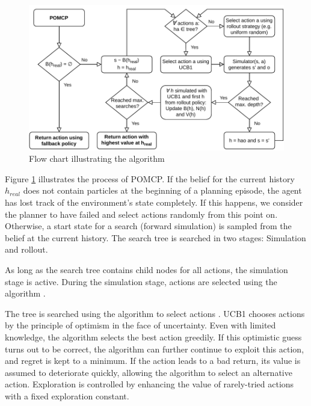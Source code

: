 \begin{figure}[htbp]
    \centerfloat
    \includegraphics[width=1.0\textwidth]{figures/POMCP.pdf}
    \caption{Flow chart illustrating the  algorithm}
    \label{fig:pomcp}
\end{figure}


\noindent
Figure \ref{fig:pomcp} illustrates the process of POMCP.  If the belief for the current history $h_{real}$ does not contain particles at the beginning of a planning episode, the agent has lost track of the environment's state completely. If this happens, we consider the planner to have failed and select actions randomly from this point on. Otherwise, a start state for a search (forward simulation) is sampled from the belief at the current history. The search tree is searched in two stages: Simulation and rollout. 


As long as the search tree contains child nodes for all actions, the simulation stage is active.  During the simulation stage, actions are selected using the  algorithm \parencite{ucb1}.


The tree is searched using the  algorithm to select actions \parencite{ucb1}. UCB1 chooses actions by the principle of optimism in the face of uncertainty. Even with limited knowledge, the algorithm selects the best action greedily. If this optimistic guess turns out to be correct, the algorithm can further continue to exploit this action, and regret is kept to a minimum. If the action leads to a bad return, its value is assumed to deteriorate quickly, allowing the algorithm to select an alternative action. Exploration is controlled by enhancing the value of rarely-tried actions with a fixed exploration constant.

